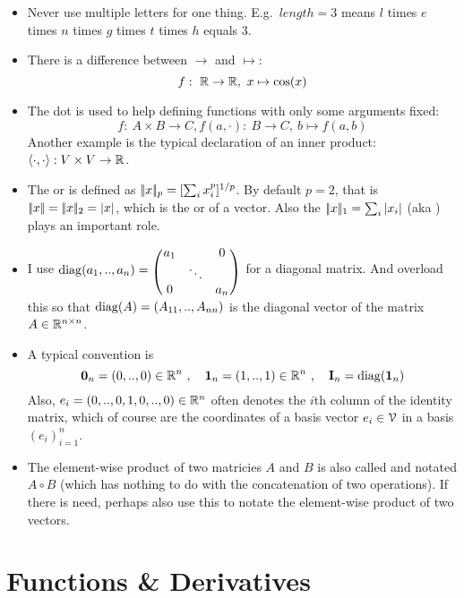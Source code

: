 \begin{itemize}
\item Never use multiple letters for one thing. E.g.\ $length = 3$
means $l$ times $e$ times $n$ times $g$ times $t$ times $h$ equals
$3$.
\item There is a difference between $\to$ and $\mapsto$:
\begin{equation}
 f:~ {\mathbb{R}} \to {\mathbb{R}},~ x \mapsto \cos(x)
\end{equation}
\item The dot is used to help defining functions with only some arguments fixed: 
\begin{equation}
f:~ A\times B \to C \comma f(a,\cdot):~ B \to C,~ b\mapsto f(a,b)
\end{equation}
Another example is the typical declaration of an inner product: $\langle\cdot,\cdot\rangle: V \times V \to {\mathbb{R}}$.
\item The  or  is defined as $|\!|x|\!|_p = [\sum_i x_i^p]^{1/p}$. By default
$p=2$, that is $|\!|x|\!|=|\!|x|\!|_2=|x|$, which is the  or  of a
vector. Also the  $|\!|x|\!|_1 = \sum_i |x_i|$ (aka ) plays an important role.
\item I use $\diag(a_1,..,a_n) = \mat{ccc}{a_1 && 0 \\ & \ddots & \\ 0 &&
a_n}$ for a diagonal matrix. And overload this so that ${\rm diag}(A) = (A_{11},..,A_{nn})$ is the diagonal vector of the matrix $A\in{\mathbb{R}}^{n\times n}$.
\item A typical convention is
\begin{equation}
\boldsymbol 0_n = (0,..,0)\in{\mathbb{R}}^n
~,\quad \boldsymbol 1_n = (1,..,1) \in {\mathbb{R}}^n
~,\quad {\rm\bf I}_n = {\rm diag}(\boldsymbol 1_n)
\end{equation}
Also, $e_i=(0,..,0,1,0,..,0) \in{\mathbb{R}}^n$ often denotes the $i$th column of
the identity matrix, which of course are the coordinates of a basis
vector $e_i\in{\cal V}$ in a basis $(e_i)_{i=1}^n$.
\item The element-wise product of two matricies $A$ and $B$ is also
called  and notated $A\circ B$ (which has nothing to
do with the concatenation of two operations). If there is need,
perhaps also use this to notate the element-wise product of two vectors.
\end{itemize}


\section{Functions \& Derivatives}

